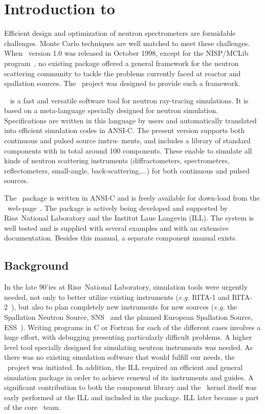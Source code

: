 
\chapter{Introduction to \MCS}

Efficient design and optimization of neutron spectrometers are
formidable challenges. Monte Carlo techniques are well matched to meet
these challenges. When \MCS\ version 1.0 was released in October
1998, except for the NISP/MCLib program~\cite{nisp_webpage}, no existing package offered a general framework for the neutron
scattering community to tackle the problems currently faced at reactor and
spallation sources. The \MCS\ project was designed to provide such a framework.

\MCS\ %
is a fast and versatile software tool for neutron ray-tracing simulations.
It is based on a meta-language specially designed for neutron
simulation. Specifications are written in this language by users and
automatically translated into efficient simulation codes in ANSI-C.
The present version supports both continuous and pulsed source instru-
ments, and includes a library of standard
components with in total around 100 components. These enable to simulate all kinds of neutron scattering instruments (diffractometers, spectrometers, reflectometers, small-angle, back-scattering,...) for both continuous and pulsed sources.

The \MCS\ package is written in ANSI-C and is freely available for down-load
from the \MCS\ web-page~\cite{mcstas_webpage}. The package is actively
being developed and supported by Ris\o\ National Laboratory
and the Institut Laue Langevin (ILL).
The system is well tested and
is supplied with several examples and with an extensive documentation.
Besides this manual, a separate component manual exists.


\section{Background}

In the late 90'ies at Ris\o\ National Laboratory,
simulation tools were urgently needed,
not only to better utilize existing instruments
({\em e.g.} RITA-1 and RITA-2~\cite{cjp_73_697,pb_241_50,pb_283_343}),
but also to plan completely new instruments for new sources
({\em e.g.} the Spallation Neutron Source, SNS~\cite{sns_webpage}
and the planned European Spallation Source, ESS~\cite{ess_webpage}).
Writing programs in C or Fortran for
each of the different cases involves a huge effort, with debugging presenting
particularly difficult problems. A higher level tool specially designed
for simulating neutron instruments was needed. As there was
no existing simulation software that would fulfill our needs, the \MCS\
project was initiated.
In addition, the ILL required an efficient and general simulation
package in order to achieve renewal of its instruments and guides.
A significant contribution to both the component library and the \MCS\
kernel itself was early performed at the ILL and included in the package.
ILL later became a part of the core \MCS\ team.

